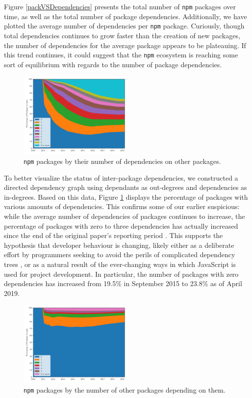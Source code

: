 \documentclass[10pt,conference]{IEEEtran}
\def\code#1{\texttt{#1}}
\begin{document}
Figure \ref{packVSDependencies} presents the total number of \code{npm} packages over time, 
as well as the total number of package dependencies. Additionally, we have plotted
the average number of dependencies per \code{npm} package. Curiously, though total dependencies
continues to grow faster than the creation of new packages, the number of dependencies 
for the average package appears to be plateauing. If this trend continues, it could suggest
that the \code{npm} ecosystem is reaching some sort of equilibrium with regards to the number
of package dependencies.

\begin{figure}
  \includegraphics[width=0.5\textwidth]{figures/npm_deps_monthly_out_degree.pdf}
  \caption{\code{npm} packages by their number of dependencies on other packages.}
  \label{outDegree}
\end{figure}

To better visualize the status of inter-package dependencies, we constructed
a directed dependency graph using dependants as out-degrees and
dependencies as in-degrees. Based on this data, Figure \ref{outDegree}
displays the percentage of packages with various amounts of dependencies. 
This confirms some of our earlier suspicious: while the average number of dependencies 
of packages continues to increase, the percentage of packages with zero 
to three dependencies has actually increased since the end of the original paper's
reporting period \cite{Wittern:2016}. This supports the hypothesis that developer 
behaviour is changing, likely either as a deliberate effort by programmers seeking to avoid the perils of 
complicated dependency trees \cite{Kikas:2017}, or as a natural result of the ever-changing
ways in which JavaScript is used for project development. In particular, the number of packages with zero dependencies
has increased from 19.5\% in September 2015 to 23.8\% as of April 2019.

\begin{figure}
  \includegraphics[width=0.5\textwidth]{figures/npm_deps_monthly_in_degree.pdf}
  \caption{\code{npm} packages by the number of other packages depending on them.}
  \label{inDegree}
\end{figure}
\end{document}
